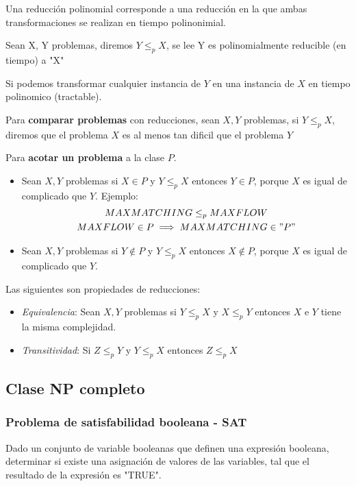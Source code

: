 \documentclass{article}
\begin{document}
Una reducción polinomial corresponde a una reducción en la que ambas transformaciones se realizan en tiempo polinonimial.

Sean X, Y problemas, diremos \(Y \leq_p X\), se lee Y es polinomialmente reducible (en tiempo) a "X"

Si podemos transformar cualquier instancia de \(Y\) en una instancia de \(X\) en tiempo polinomico (tractable).

Para \textbf{comparar problemas} con reducciones, sean \(X, Y\) problemas, si \(Y \leq_p X\), diremos que 
el problema \(X\) es al menos tan dificil que el problema \(Y\)

Para \textbf{acotar un problema} a la clase \(P\). 
\begin{itemize}
    \item Sean \(X,Y\) problemas si \(X \in P\) y \(Y \leq_p X\) 
    entonces \(Y \in P\), porque \(X\) es igual de complicado que \(Y\). Ejemplo:
    \begin{gather*}
        MAXMATCHING \leq_p MAXFLOW \\
        MAXFLOW \in P \implies MAXMATCHING \in "P"    
    \end{gather*}
    
    \item Sean \(X,Y\) problemas si \(Y \notin P\) y \(Y \leq_p X\) 
    entonces \(X \notin P\), porque \(X\) es igual de complicado que \(Y\).
    
\end{itemize}

Las siguientes son propiedades de reducciones:

\begin{itemize}
    \item \textit{Equivalencia}: Sean \(X,Y\) problemas si \(Y \leq_p X\) y \(X \leq_p Y\) 
    entonces \(X\) e \(Y\) tiene la misma complejidad.
    \item \textit{Transitividad}: Si \(Z \leq_p Y\) y \(Y \leq_p X\) 
    entonces \(Z \leq_p X\)
\end{itemize}


\subsection{Clase NP completo}

\subsubsection{Problema de satisfabilidad booleana - SAT}
Dado un conjunto de variable booleanas que definen una expresión booleana, determinar si existe una
asignación de valores de las variables, tal que el resultado de la expresión es "TRUE".
\end{document}
